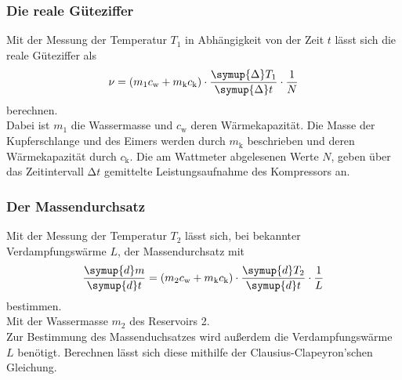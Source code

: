 \subsubsection{Die reale Güteziffer}
Mit der Messung der Temperatur $T_1$ in Abhängigkeit von der Zeit $t$ lässt sich die reale Güteziffer als 
\begin{equation}
    \nu = (m_1 c_\text{w} + m_\text{k} c_\text{k})\cdot 
    \frac{\symup{\Delta} T_1}{\symup{\Delta} t} \cdot \frac{1}{N}
    \label{eqn:Güteziffer}
\end{equation}
berechnen.\\
Dabei ist $m_1$ die Wassermasse und $c_\text{w}$ deren Wärmekapazität. Die Masse der Kupferschlange und des Eimers werden durch $m_\text{k}$ beschrieben und deren Wärmekapazität
durch $c_\text{k}$. Die am Wattmeter abgelesenen Werte $N$, geben über das Zeitintervall $\increment t$ gemittelte Leistungsaufnahme des Kompressors an.

\subsubsection{Der Massendurchsatz}
Mit der Messung der Temperatur $T_2$ lässt sich, bei bekannter Verdampfungswärme $L$, der Massendurchsatz mit\\
\begin{equation}
    \frac{\symup{d} m}{\symup{d}t} = (m_2 c_\text{w} + m_\text{k} c_\text{k}) \cdot 
    \frac{\symup{d} T_2}{\symup{d}t} \cdot  \frac{1}{L}
    \label{eqn:Massendurchsatz}
\end{equation}
bestimmen.\\
Mit der Wassermasse $m_2$ des Reservoirs 2.\\
Zur Bestimmung des Massenduchsatzes wird außerdem die Verdampfungswärme $L$ benötigt.
Berechnen lässt sich diese mithilfe der Clausius-Clapeyron'schen Gleichung.

